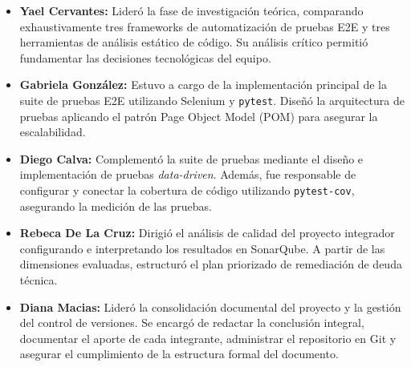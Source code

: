 \documentclass[12pt,a4paper]{article}
\begin{document}
\begin{itemize}
    \item \textbf{Yael Cervantes:} Lideró la fase de investigación teórica, comparando exhaustivamente tres frameworks de automatización de pruebas E2E y tres herramientas de análisis estático de código. Su análisis crítico permitió fundamentar las decisiones tecnológicas del equipo.
    
    \item \textbf{Gabriela González:} Estuvo a cargo de la implementación principal de la suite de pruebas E2E utilizando Selenium y \texttt{pytest}. Diseñó la arquitectura de pruebas aplicando el patrón Page Object Model (POM) para asegurar la escalabilidad.
    
    \item \textbf{Diego Calva:} Complementó la suite de pruebas mediante el diseño e implementación de pruebas \textit{data-driven}. Además, fue responsable de configurar y conectar la cobertura de código utilizando \texttt{pytest-cov}, asegurando la medición de las pruebas.
    
    \item \textbf{Rebeca De La Cruz:} Dirigió el análisis de calidad del proyecto integrador configurando e interpretando los resultados en SonarQube. A partir de las dimensiones evaluadas, estructuró el plan priorizado de remediación de deuda técnica.
    
    \item \textbf{Diana Macias:} Lideró la consolidación documental del proyecto y la gestión del control de versiones. Se encargó de redactar la conclusión integral, documentar el aporte de cada integrante, administrar el repositorio en Git y asegurar el cumplimiento de la estructura formal del documento.
\end{itemize}
\end{document}
